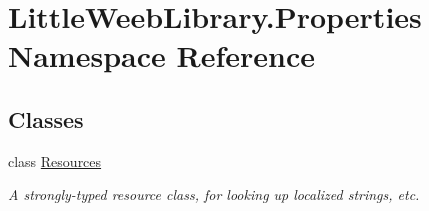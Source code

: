 \hypertarget{namespace_little_weeb_library_1_1_properties}{}\section{Little\+Weeb\+Library.\+Properties Namespace Reference}
\label{namespace_little_weeb_library_1_1_properties}
\subsection*{Classes}
\begin{DoxyCompactItemize}
\item 
class \mbox{\hyperlink{class_little_weeb_library_1_1_properties_1_1_resources}{Resources}}
\begin{DoxyCompactList}\small\item\em A strongly-\/typed resource class, for looking up localized strings, etc. \end{DoxyCompactList}\end{DoxyCompactItemize}
